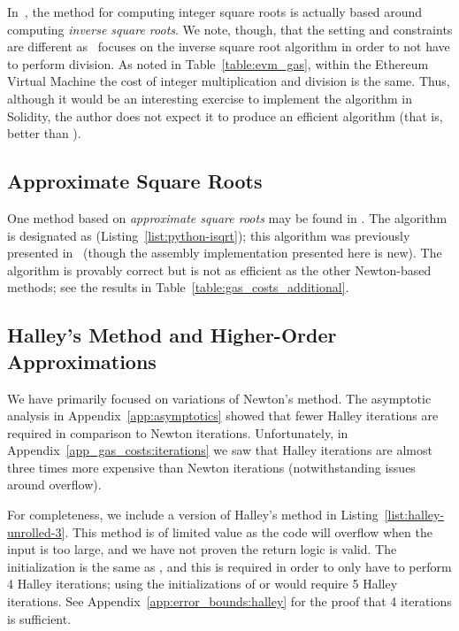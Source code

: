 In~\cite{FormalVerIsqrt}, the method for computing integer square roots
is actually based around computing \emph{inverse square roots}.
We note, though, that the setting and constraints are different
as~\cite{FormalVerIsqrt} focuses on the inverse square root algorithm
in order to not have to perform division.
As noted in Table~\ref{table:evm_gas},
within the Ethereum Virtual Machine
the cost of integer multiplication and division is the same.
Thus, although it would be an interesting exercise
to implement the algorithm in Solidity,
the author does not expect it to produce an efficient algorithm
(that is, better than \UnrolledThree{}).


\subsection{Approximate Square Roots}

One method based on \emph{approximate square roots}
may be found in \cite{PythonIsqrt}.
The algorithm is designated as
\python{} (Listing~\ref{list:python-isqrt});
this algorithm was previously presented in~\cite{EfficientIsqrt}
(though the assembly implementation presented here is new).
The algorithm is provably correct
but is not as efficient as the other Newton-based methods;
see the results in Table~\ref{table:gas_costs_additional}.




\subsection{Halley's Method and Higher-Order Approximations}
\label{app_additional_algs:halley}

We have primarily focused on variations of Newton's method.
The asymptotic analysis in Appendix~\ref{app:asymptotics}
showed that fewer Halley iterations are required
in comparison to Newton iterations.
Unfortunately, in Appendix~\ref{app_gas_costs:iterations}
we saw that Halley iterations are almost three times more expensive
than Newton iterations
(notwithstanding issues around overflow).

For completeness, we include a version of Halley's method
in Listing~\ref{list:halley-unrolled-3}.
This method is of limited value as the code will overflow
when the input is too large,
and we have not proven the return logic is valid.
The initialization is the same as \UnrolledThree{},
and this is required in order to only have to perform 4 Halley iterations;
using the initializations of \UnrolledOne{} or \UnrolledTwo{}
would require 5 Halley iterations.
See Appendix~\ref{app:error_bounds:halley}
for the proof that 4 iterations is sufficient.

